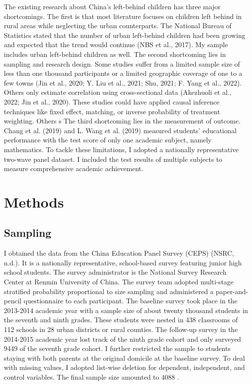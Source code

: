 \documentclass[
  man,floatsintext]{apa7}
\begin{document}
The existing research about China's left-behind children has three major shortcomings. The first is that most literature focuses on children left behind in rural areas while neglecting the urban counterparts. The National Bureau of Statistics stated that the number of urban left-behind children had been growing and expected that the trend would continue (NBS et al., 2017). My sample includes urban left-behind children as well. The second shortcoming lies in sampling and research design. Some studies suffer from a limited sample size of less than one thousand participants or a limited geographic coverage of one to a few towns (Jin et al., 2020; Y. Liu et al., 2021; Shu, 2021; F. Yang et al., 2022). Others only estimate correlation using cross-sectional data (Akezhuoli et al., 2022; Jin et al., 2020). These studies could have applied causal inference techniques like fixed effect, matching, or inverse probability of treatment weighting. Others s The third shortcoming lies in the measurement of outcome. Chang et al. (2019) and L. Wang et al. (2019) measured students' educational performance with the test score of only one academic subject, namely mathematics. To tackle these limitations, I adopted a nationally representative two-wave panel dataset. I included the test results of multiple subjects to measure comprehensive academic achievement.

\newpage

\hypertarget{methods}{%
\section{Methods}\label{methods}}

\hypertarget{sampling}{%
\subsection{Sampling}\label{sampling}}

I obtained the data from the China Education Panel Survey (CEPS) (NSRC, n.d.). It is a nationally representative, school-based survey featuring junior high school students. The survey administrator is the National Survey Research Center at Renmin University of China. The survey team adopted multi-stage stratified probability proportional to size sampling and administered a paper-and-pencil questionnaire to each participant. The baseline survey took place in the 2013-2014 academic year with a sample size of about twenty thousand students in the seventh and ninth grades. These students were nested in 438 classrooms of 112 schools in 28 urban districts or rural counties. The follow-up survey in the 2014-2015 academic year lost track of the ninth grade cohort and only surveyed 9449 of the seventh grade cohort. I further restricted the sample to students staying with both parents at the original domicile at the baseline survey. To deal with missing values, I adopted list-wise deletion for dependent, independent, and control variables. The final sample size amounted to 4088 .
\end{document}
